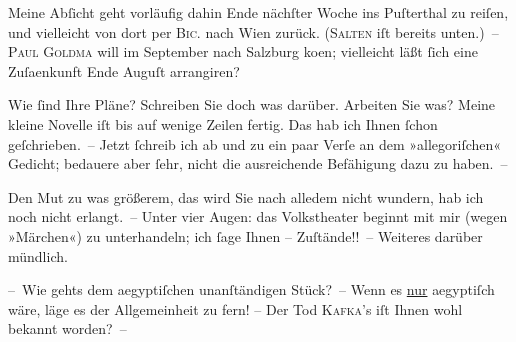\pstart
           Meine Abſicht geht vorläufig dahin {\pb}Ende nächſter Woche
               ins Puſterthal zu reiſen, und vielleicht von dort
               per \textsc{Bic.} nach Wien
               zurück. (\textsc{Salten} iſt bereits unten.) – \textsc{Paul Goldma{\geminationn}} will im September nach Salzburg
                  ko{\geminationm}en; vielleicht läßt ſich eine Zuſa{\geminationm}enkunft Ende Auguſt arrangiren?\pend
           
\pstart
           Wie ſind Ihre Pläne? Schreiben Sie doch was darüber. Arbeiten Sie was? Meine kleine
                  Novelle iſt bis auf wenige Zeilen fertig. {\pb}Das hab ich Ihnen ſchon geſchrieben. – Jetzt ſchreib ich
               ab und zu ein paar Verſe an dem »allegoriſchen« Gedicht; bedauere aber ſehr, nicht die ausreichende Befähigung dazu zu
               haben. –\pend
           
\pstart
           Den Mut zu was größerem, das wird Sie nach alledem nicht wundern, hab ich noch nicht
               erlangt. – Unter vier Augen: das Volkstheater
               beginnt mit mir \introOben{}(wegen »Märchen«)\introOben{} zu unterhandeln; ich ſage Ihnen – Zuſtände!! – Weiteres
               darüber mündlich.\pend
           
\pstart
           {\pb}– Wie gehts dem aegyptiſchen unanſtändigen Stück? – Wenn es \uline{nur}{ }aegyptiſch wäre, läge es der Allgemeinheit zu
               fern! – Der Tod \textsc{Kafka}’s iſt Ihnen wohl bekannt worden? –\pend
           
